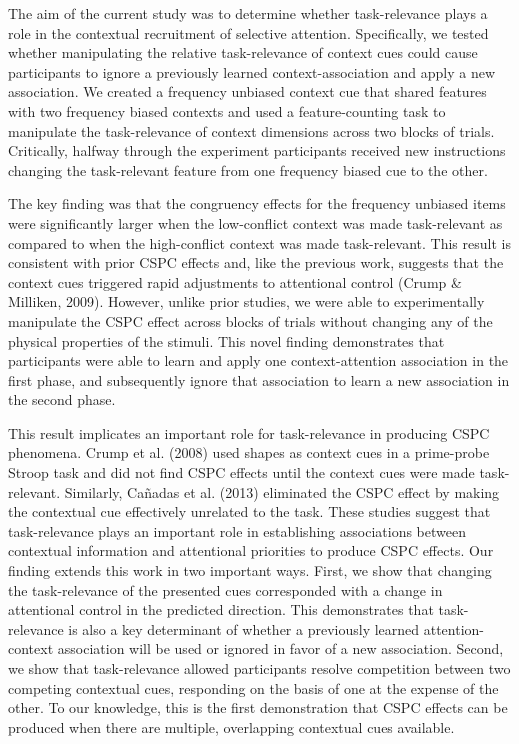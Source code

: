 \documentclass[english,,man,floatsintext]{apa6}
\begin{document}
The aim of the current study was to determine whether task-relevance plays a role in the contextual recruitment of selective attention. Specifically, we tested whether manipulating the relative task-relevance of context cues could cause participants to ignore a previously learned context-association and apply a new association. We created a frequency unbiased context cue that shared features with two frequency biased contexts and used a feature-counting task to manipulate the task-relevance of context dimensions across two blocks of trials. Critically, halfway through the experiment participants received new instructions changing the task-relevant feature from one frequency biased cue to the other.

The key finding was that the congruency effects for the frequency unbiased items were significantly larger when the low-conflict context was made task-relevant as compared to when the high-conflict context was made task-relevant. This result is consistent with prior CSPC effects and, like the previous work, suggests that the context cues triggered rapid adjustments to attentional control (Crump \& Milliken, 2009). However, unlike prior studies, we were able to experimentally manipulate the CSPC effect across blocks of trials without changing any of the physical properties of the stimuli. This novel finding demonstrates that participants were able to learn and apply one context-attention association in the first phase, and subsequently ignore that association to learn a new association in the second phase.

This result implicates an important role for task-relevance in producing CSPC phenomena. Crump et al. (2008) used shapes as context cues in a prime-probe Stroop task and did not find CSPC effects until the context cues were made task-relevant. Similarly, Cañadas et al. (2013) eliminated the CSPC effect by making the contextual cue effectively unrelated to the task. These studies suggest that task-relevance plays an important role in establishing associations between contextual information and attentional priorities to produce CSPC effects. Our finding extends this work in two important ways. First, we show that changing the task-relevance of the presented cues corresponded with a change in attentional control in the predicted direction. This demonstrates that task-relevance is also a key determinant of whether a previously learned attention-context association will be used or ignored in favor of a new association. Second, we show that task-relevance allowed participants resolve competition between two competing contextual cues, responding on the basis of one at the expense of the other. To our knowledge, this is the first demonstration that CSPC effects can be produced when there are multiple, overlapping contextual cues available.
\end{document}
